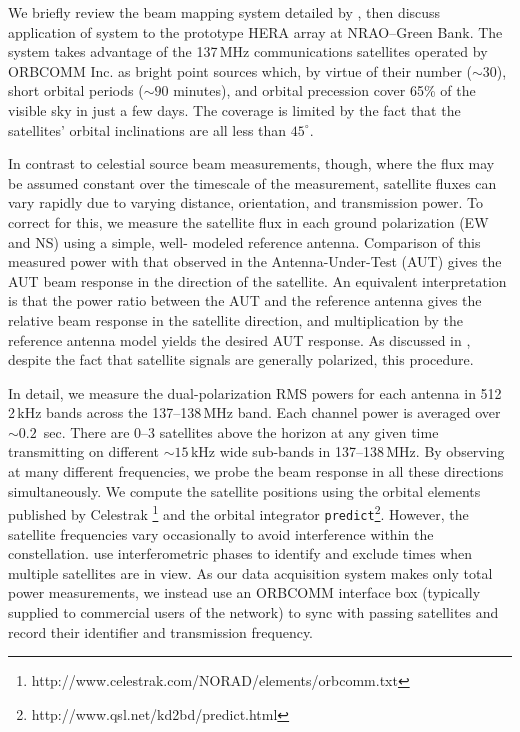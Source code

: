 \documentclass{emulateapj}
\begin{document}
We briefly review the beam mapping system detailed by \citet{neben15}, then discuss 
application of system to the prototype HERA array at NRAO--Green Bank. The system 
takes advantage of the 137\,MHz communications satellites operated by ORBCOMM Inc. 
as bright point sources which, by virtue of their number ($\sim30$), short orbital periods 
($\sim90$ minutes), and orbital precession cover 65\% of the visible sky in just a few 
days. The coverage is limited by the fact that the satellites' orbital inclinations are all less 
than $45^\circ$. 

In contrast to celestial source beam measurements, though, where the flux may be 
assumed constant over the timescale of the measurement, satellite fluxes can vary rapidly 
due to varying distance, orientation, and transmission power. To correct for this, we 
measure the satellite flux in each ground polarization (EW and NS) using a simple, well-
modeled reference antenna. Comparison of this measured power with that observed in the 
Antenna-Under-Test (AUT) gives the AUT beam response in the direction of the satellite. 
An equivalent interpretation is that the power ratio between the AUT and the reference 
antenna gives the relative beam response in the satellite direction, and multiplication by 
the reference antenna model yields the desired AUT response. As discussed in 
\citet{neben15}, despite the fact that satellite signals are generally polarized, this 
procedure.

In detail, we measure the dual-polarization RMS powers for each antenna in 512 2\,kHz 
bands across the 137--138\,MHz band. Each channel power is averaged over $\sim0.2$
\,sec. There are 0--3 satellites above the horizon at any given time transmitting on different 
$\sim15$\,kHz wide sub-bands in 137--138\,MHz. By observing at many different 
frequencies, we probe the beam response in all these directions simultaneously. We 
compute the satellite positions using the orbital elements published by Celestrak
\footnote{http://www.celestrak.com/NORAD/elements/orbcomm.txt} and the orbital 
integrator \texttt{predict}\footnote{http://www.qsl.net/kd2bd/predict.html}. However, the 
satellite frequencies vary occasionally to avoid interference within the constellation. 
\citet{zheng14} use interferometric phases to identify and exclude times when multiple 
satellites are in view. As our data acquisition system makes only total power 
measurements, we instead use an ORBCOMM interface box (typically supplied to 
commercial users of the network) to sync with passing satellites and record their identifier 
and transmission frequency.
\end{document}
